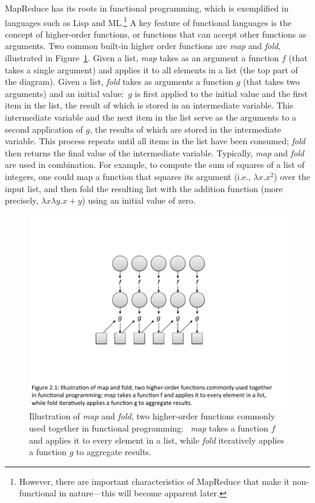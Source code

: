 \documentclass[11pt]{article}
\begin{document}
MapReduce has its roots in functional programming, which is
exemplified in languages such as Lisp and ML.\footnote{However, there
are important characteristics of MapReduce that make it non-functional
in nature---this will become apparent later.} A key feature of
functional languages is the concept of higher-order functions, or
functions that can accept other functions as arguments.  Two common
built-in higher order functions are \emph{map} and \emph{fold},
illustrated in Figure~\ref{figure:chapter2:functional}.  Given a list,
\emph{map} takes as an argument a function $f$ (that takes a single
argument) and applies it to all elements in a list (the top part of
the diagram).  Given a list, \emph{fold} takes as arguments a function
$g$ (that takes two arguments) and an initial value:\ $g$ is first
applied to the initial value and the first item in the list, the
result of which is stored in an intermediate variable.  This
intermediate variable and the next item in the list serve as the
arguments to a second application of $g$, the results of which are
stored in the intermediate variable.  This process repeats until all
items in the list have been consumed; \emph{fold} then returns the
final value of the intermediate variable.  Typically, \emph{map} and
\emph{fold} are used in combination.  For example, to compute the sum
of squares of a list of integers, one could map a function that
squares its argument (i.e., $\lambda x. x^2$) over the input list, and
then fold the resulting list with the addition function (more
precisely, $\lambda x \lambda y. x + y$) using an initial value of
zero.

\begin{figure}[t]
\begin{center}
\includegraphics[scale=0.6]{figures/fig-ch2-functional-programming.pdf}
\end{center}
\caption{Illustration of \emph{map} and \emph{fold}, two higher-order
  functions commonly used together in functional programming:\ \emph{
    map} takes a function $f$ and applies it to every element in a
    list, while \emph{fold} iteratively applies a function $g$ to
    aggregate results.}
\label{figure:chapter2:functional}
\end{figure}
\end{document}
